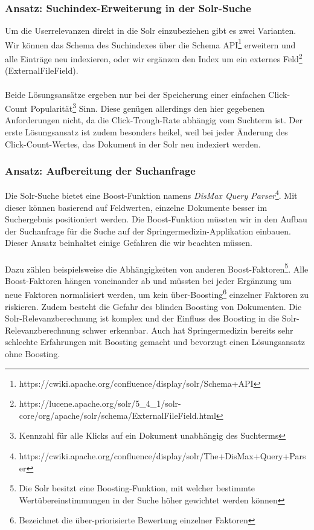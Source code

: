 \subsubsection{Ansatz: Suchindex-Erweiterung in der Solr-Suche}
\label{sec:Einfuehrung:Methodik:SucheEinbinden:SolrSuche}

Um die Userrelevanzen direkt in die Solr einzubeziehen gibt es zwei Varianten. Wir können das Schema des Suchindexes über die Schema API\footnote{https://cwiki.apache.org/confluence/display/solr/Schema+API} erweitern und alle Einträge neu indexieren, oder wir ergänzen den Index um ein externes Feld\footnote{https://lucene.apache.org/solr/5\_4\_1/solr-core/org/apache/solr/schema/ExternalFileField.html} (ExternalFileField).
\\
\\
Beide Lösungsansätze ergeben nur bei der Speicherung einer einfachen Click-Count Popularität\footnote{Kennzahl für alle Klicks auf ein Dokument unabhängig des Suchterms} Sinn. Diese genügen allerdings den hier gegebenen Anforderungen nicht, da die Click-Trough-Rate abhängig vom Suchterm ist. Der erste Lösungsansatz ist zudem besonders heikel, weil bei jeder Änderung des Click-Count-Wertes, das Dokument in der Solr neu indexiert werden.

\subsubsection{Ansatz: Aufbereitung der Suchanfrage}
\label{sec:Einfuehrung:Methodik:SucheEinbinden:Suchanfrage}

Die Solr-Suche bietet eine Boost-Funktion namens \textit{DisMax Query Parser}\footnote{https://cwiki.apache.org/confluence/display/solr/The+DisMax+Query+Parser}.  Mit dieser können basierend auf Feldwerten, einzelne Dokumente besser im Suchergebnis positioniert werden. Die Boost-Funktion müssten wir in den Aufbau der Suchanfrage für die Suche auf der Springermedizin-Applikation einbauen. Dieser Ansatz beinhaltet einige Gefahren die wir beachten müssen.
\\
\\
Dazu zählen beispielsweise die Abhängigkeiten von anderen Boost-Faktoren\footnote{Die Solr besitzt eine Boosting-Funktion, mit welcher bestimmte Wertübereinstimmungen in der Suche höher gewichtet werden können}. Alle Boost-Faktoren hängen voneinander ab und müssten bei jeder Ergänzung um neue Faktoren normalisiert werden, um kein \glqq über-Boosting\grqq{}\footnote{Bezeichnet die über-priorisierte Bewertung einzelner Faktoren} einzelner Faktoren zu riskieren. Zudem besteht die Gefahr des \glqq blinden Boosting\grqq{} von Dokumenten. Die Solr-Relevanzberechnung ist komplex und der Einfluss des \glqq Boosting\grqq{} in die Solr-Relevanzberechnung schwer erkennbar. Auch hat Springermedizin bereits sehr schlechte Erfahrungen mit \glqq Boosting\grqq{} gemacht und bevorzugt einen Lösungsansatz ohne \glqq Boosting\grqq{}.

